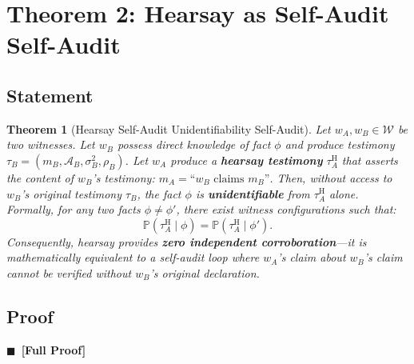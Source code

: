 \documentclass[11pt,a4paper]{article}
\newtheorem{theorem}{Theorem}[section]
\theoremstyle{definition}
\newcommand{\rigorFull}[0]{$\blacksquare$~\textbf{[Full Proof]}}
\newcommand{\Pbb}{\mathbb{P}}
\newcommand{\witnessSet}{\mathcal{W}}           %
\newcommand{\fact}{\phi}                        %
\newcommand{\hear}{\mathrm{H}}                  %
\begin{document}
\section{Theorem 2: Hearsay as Self-Audit Self-Audit}
\label{sec:hearsay}

\subsection{Statement}

\begin{theorem}[Hearsay Self-Audit Unidentifiability Self-Audit]
\label{thm:hearsay}
Let $w_A, w_B \in \witnessSet$ be two witnesses. Let $w_B$ possess direct knowledge of fact $\fact$ and produce testimony $\tau_B = (m_B, \mathcal{A}_B, \sigma_B^2, \rho_B)$. Let $w_A$ produce a \textbf{hearsay testimony} $\tau_A^{\hear}$ that asserts the content of $w_B$'s testimony: $m_A = \text{``}w_B \text{ claims } m_B\text{''}$. Then, without access to $w_B$'s original testimony $\tau_B$, the fact $\fact$ is \textbf{unidentifiable} from $\tau_A^{\hear}$ alone. Formally, for any two facts $\fact \neq \fact'$, there exist witness configurations such that:
\begin{equation}
    \Pbb(\tau_A^{\hear} \mid \fact) = \Pbb(\tau_A^{\hear} \mid \fact').
    \label{eq:hearsay_unident}
\end{equation}
Consequently, hearsay provides \textbf{zero independent corroboration}---it is mathematically equivalent to a self-audit loop where $w_A$'s claim about $w_B$'s claim cannot be verified without $w_B$'s original declaration.
\end{theorem}

\subsection{Proof} \rigorFull
\end{document}
